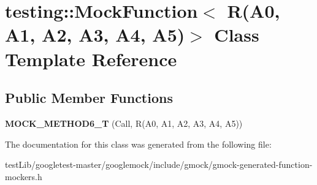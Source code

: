 \hypertarget{classtesting_1_1MockFunction_3_01R_07A0_00_01A1_00_01A2_00_01A3_00_01A4_00_01A5_08_4}{}\section{testing\+:\+:Mock\+Function$<$ R(A0, A1, A2, A3, A4, A5)$>$ Class Template Reference}
\label{classtesting_1_1MockFunction_3_01R_07A0_00_01A1_00_01A2_00_01A3_00_01A4_00_01A5_08_4}
\subsection*{Public Member Functions}
\begin{DoxyCompactItemize}
\item 
\mbox{\label{classtesting_1_1MockFunction_3_01R_07A0_00_01A1_00_01A2_00_01A3_00_01A4_00_01A5_08_4_ae66d20991ea3ab7d2b817c54df80653e}} 
{\bfseries M\+O\+C\+K\+\_\+\+M\+E\+T\+H\+O\+D6\+\_\+T} (Call, R(A0, A1, A2, A3, A4, A5))
\end{DoxyCompactItemize}


The documentation for this class was generated from the following file\+:\begin{DoxyCompactItemize}
\item 
test\+Lib/googletest-\/master/googlemock/include/gmock/gmock-\/generated-\/function-\/mockers.\+h\end{DoxyCompactItemize}
